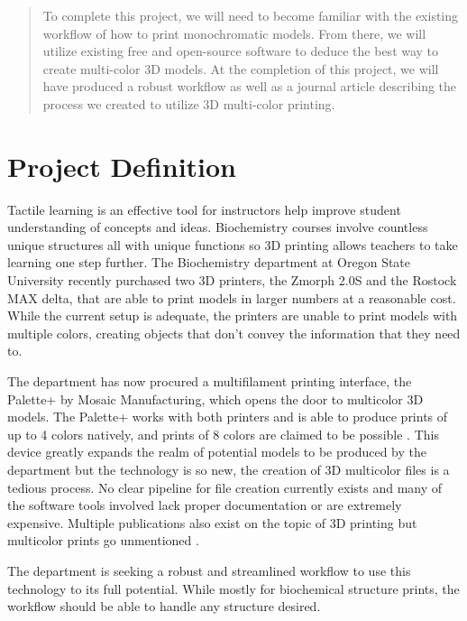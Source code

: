\documentclass[letterpaper, onecolumn, draftclsnofoot, 10pt, compsoc]{IEEEtran}
\begin{document}
\begin{titlepage}
\begin{singlespace}
\begin{abstract}
            To complete this project, we will need to become familiar with the existing workflow of how to print monochromatic models. From there, we will utilize existing free and open-source software to deduce the best way to create multi-color 3D models. At the completion of this project, we will have produced a robust workflow as well as a journal article describing the process we created to utilize 3D multi-color printing.\par
        \end{abstract}     
    \end{singlespace}
\end{titlepage}
\newpage
{}
\tableofcontents
\clearpage

\section{Project Definition}
    \begin{singlespace}
        Tactile learning is an effective tool for instructors help improve student understanding of concepts and ideas. Biochemistry courses involve countless unique structures all with unique functions so 3D printing allows teachers to take learning one step further. The Biochemistry department at Oregon State University recently purchased two 3D printers, the Zmorph 2.0S and the Rostock MAX delta, that are able to print models in larger numbers at a reasonable cost. While the current setup is adequate, the printers are unable to print models with multiple colors, creating objects that don’t convey the information that they need to.\par
        The department has now procured a multifilament printing interface, the Palette+ by Mosaic Manufacturing, which opens the door to multicolor 3D models. The Palette+ works with both printers and is able to produce prints of up to 4 colors natively, and prints of 8 colors are claimed to be possible \cite{8colorprint}. This device greatly expands the realm of potential models to be produced by the department but the technology is so new, the creation of 3D multicolor files is a tedious process. No clear pipeline for file creation currently exists and many of the software tools involved lack proper documentation or are extremely expensive. Multiple publications also exist on the topic of 3D printing but multicolor prints go unmentioned \cite{progconv}.\par
        The department is seeking a robust and streamlined workflow to use this technology to its full potential. While mostly for biochemical structure prints, the workflow should be able to handle any structure desired.\par
    \end{singlespace}
\end{document}

